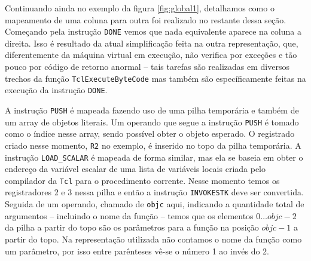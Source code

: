 

Continuando ainda no exemplo da figura \ref{fig:global1}, detalhamos
como o mapeamento de uma coluna para outra foi realizado no restante
dessa seção. Começando
pela instrução \verb!DONE! vemos que
nada equivalente aparece na coluna a direita. Isso é resultado da
atual simplificação feita na outra representação, que, diferentemente
da máquina virtual em execução, não verifica por exceções e tão pouco
por código de retorno anormal -- tais tarefas são realizadas em
diversos trechos da função \verb!TclExecuteByteCode! mas também são
específicamente feitas na execução da instrução \verb!DONE!.

A instrução \verb!PUSH! é mapeada fazendo uso de uma pilha temporária e
também de um array de objetos literais. Um operando que segue a
instrução \verb!PUSH! é tomado como o índice nesse array, sendo
possível obter o objeto esperado. O registrado criado nesse momento,
\verb!R2! no exemplo, é
inserido no topo da pilha temporária. A instrução \verb!LOAD_SCALAR!
é mapeada de forma similar, mas ela se baseia em obter o
endereço da variável escalar de uma lista de variáveis locais
criada pelo compilador da \texttt{Tcl} para o procedimento
corrente. Nesse momento temos os registradores 2 e 3 nessa pilha e
então a instrução \verb!INVOKESTK! deve ser convertida. Seguida de um
operando, chamado de \verb!objc! aqui, indicando a quantidade total de
argumentos -- incluindo o nome da função -- temos que os elementos
$0 \dots objc - 2$ da pilha a partir do topo são os parâmetros para
a função na posição $objc - 1$ a partir do topo. Na representação
utilizada não contamos o nome da função como um parâmetro, por isso
entre parênteses vê-se o número 1 ao invés do 2.

